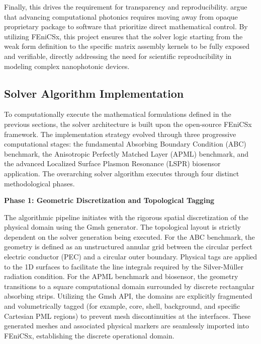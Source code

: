 \vspace{12pt}

Finally, this drives the requirement for transparency and reproducibility. \citet{Owusu-Agyemang2025} argue that advancing computational photonics requires moving away from opaque proprietary package to software that prioritize direct mathematical control. By utilizing FEniCSx, this project ensures that the solver logic starting from the weak form definition to the specific matrix assembly kernels to be fully exposed and verifiable, directly addressing the need for scientific reproducibility in modeling complex nanophotonic devices.

\subsection{Solver Algorithm Implementation}

To computationally execute the mathematical formulations defined in the previous sections, the solver architecture is built upon the open-source FEniCSx framework. The implementation strategy evolved through three progressive computational stages: the fundamental Absorbing Boundary Condition (ABC) benchmark, the Anisotropic Perfectly Matched Layer (APML) benchmark, and the advanced Localized Surface Plasmon Resonance (LSPR) biosensor application. The overarching solver algorithm executes through four distinct methodological phases.

\vspace{12pt}

\noindent\textbf{Phase 1: Geometric Discretization and Topological Tagging}

\vspace{6pt}

The algorithmic pipeline initiates with the rigorous spatial discretization of the physical domain using the Gmsh generator. The topological layout is strictly dependent on the solver generation being executed. For the ABC benchmark, the geometry is defined as an unstructured annular grid between the circular perfect electric conductor (PEC) and a circular outer boundary. Physical tags are applied to the 1D surfaces to facilitate the line integrals required by the Silver-M\"{u}ller radiation condition. For the APML benchmark and biosensor, the geometry transitions to a square computational domain surrounded by discrete rectangular absorbing strips. Utilizing the Gmsh API, the domains are explicitly fragmented and volumetrically tagged (for example, core, shell, background, and specific Cartesian PML regions) to prevent mesh discontinuities at the interfaces. These generated meshes and associated physical markers are seamlessly imported into FEniCSx, establishing the discrete operational domain.

